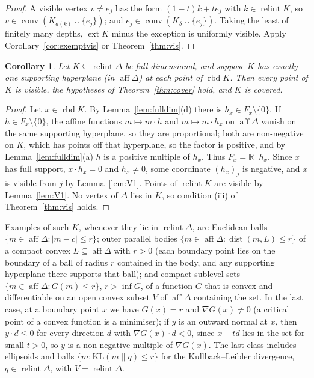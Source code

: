 \documentclass[11pt]{article}
\newcommand{\R}{\mathbb{R}}
\DeclareMathOperator{\conv}{conv}
\DeclareMathOperator{\relint}{relint}
\DeclareMathOperator{\rbd}{rbd}
\DeclareMathOperator{\aff}{aff}
\DeclareMathOperator{\ext}{ext}
\theoremstyle{plain}
\newtheorem{corollary}[theorem]{Corollary}
\theoremstyle{definition}
\theoremstyle{remark}
\begin{document}
\begin{proof}
A visible vertex $v\neq e_j$ has the form $(1-t)k+te_j$ with $k\in\relint K$, so
$v\in\conv(K_{d(k)}\cup\{e_j\})$; and $e_j\in\conv(K_\delta\cup\{e_j\})$. Taking the least
of finitely many depths, $\ext K$ minus the exception is uniformly visible. Apply
Corollary~\ref{cor:exemptvis} or Theorem~\ref{thm:vis}.
\end{proof}

\begin{corollary}\label{cor:smooth}
Let $K\subseteq\relint\Delta$ be full-dimensional, and suppose $K$ has exactly one
supporting hyperplane (in $\aff\Delta$) at each point of $\rbd K$. Then every point of $K$
is visible, the hypotheses of Theorem~\ref{thm:cover} hold, and $K$ is covered.
\end{corollary}

\begin{proof}
Let $x\in\rbd K$. By Lemma~\ref{lem:fulldim}(d) there is $h_x\in F_x\setminus\{0\}$. If
$h\in F_x\setminus\{0\}$, the affine functions $m\mapsto m\cdot h$ and $m\mapsto m\cdot
h_x$ on $\aff\Delta$ vanish on the same supporting hyperplane, so they are proportional;
both are non-negative on $K$, which has points off that hyperplane, so the factor is
positive, and by Lemma~\ref{lem:fulldim}(a) $h$ is a positive multiple of $h_x$. Thus
$F_x=\R_+h_x$. Since $x$ has full support, $x\cdot h_x=0$ and $h_x\neq0$, some coordinate
$(h_x)_j$ is negative, and $x$ is visible from $j$ by Lemma~\ref{lem:V1}. Points of
$\relint K$ are visible by Lemma~\ref{lem:V1}. No vertex of $\Delta$ lies in $K$, so
condition (iii) of Theorem~\ref{thm:vis} holds.
\end{proof}

Examples of such $K$, whenever they lie in $\relint\Delta$, are Euclidean balls
$\{m\in\aff\Delta:|m-c|\le r\}$; outer parallel bodies $\{m\in\aff\Delta:\operatorname{dist}
(m,L)\le r\}$ of a compact convex $L\subseteq\aff\Delta$ with $r>0$ (each boundary point
lies on the boundary of a ball of radius $r$ contained in the body, and any supporting
hyperplane there supports that ball); and compact sublevel sets $\{m\in\aff\Delta:G(m)\le
r\}$, $r>\inf G$, of a function $G$ that is convex and differentiable on an open convex
subset $V$ of $\aff\Delta$ containing the set. In the last
case, at a boundary point $x$ we have $G(x)=r$ and $\nabla G(x)\ne0$ (a critical point of
a convex function is a minimiser); if $y$ is an outward normal at $x$, then $y\cdot d\le0$
for every direction $d$ with $\nabla G(x)\cdot d<0$, since $x+td$ lies in the set for
small $t>0$, so $y$ is a non-negative multiple of $\nabla G(x)$. The last class includes
ellipsoids and balls $\{m:\mathrm{KL}(m\|q)\le r\}$ for the Kullback--Leibler divergence,
$q\in\relint\Delta$, with $V=\relint\Delta$.
\end{document}
